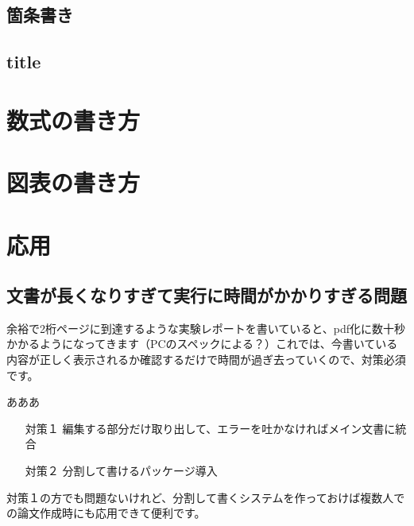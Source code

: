 \documentclass[uplatex,dvipdfmx]{jsarticle}
\numberwithin{equation}{section}
\begin{document}
\subsection*{箇条書き}
\subsection*{title}
\section{数式の書き方}
\section{図表の書き方}
\section{応用}
\subsection{文書が長くなりすぎて実行に時間がかかりすぎる問題}
余裕で2桁ページに到達するような実験レポートを書いていると、pdf化に数十秒かかるようになってきます（PCのスペックによる？）これでは、今書いている内容が正しく表示されるか確認するだけで時間が過ぎ去っていくので、対策必須です。

あああ
\begin{itemize}
  \item[対策１] 編集する部分だけ取り出して、エラーを吐かなければメイン文書に統合
  \item[対策２] 分割して書けるパッケージ導入
\end{itemize}
対策１の方でも問題ないけれど、分割して書くシステムを作っておけば複数人での論文作成時にも応用できて便利です。
\end{document}
